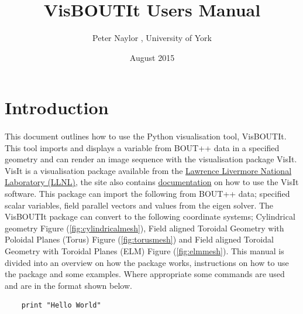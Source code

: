 \documentclass[12pt,a4paper]{article}
\author{Peter Naylor , University of York}
\title{VisBOUTIt Users Manual}
\date{August 2015}
\begin{document}
	\maketitle
	\tableofcontents
	\section{Introduction}
	\paragraph{}
	This document outlines how to use the Python visualisation tool, VisBOUTIt. This tool imports and displays a variable from BOUT++ data in a specified geometry and can render an image sequence with the visualisation package VisIt. VisIt is a visualisation package available from the \href{https://wci.llnl.gov/simulation/computer-codes/visit}{Lawrence Livermore National Laboratory (LLNL)}, the site also contains \href{https://wci.llnl.gov/simulation/computer-codes/visit/manuals}{documentation} on how to use the VisIt software.  This package can import the following from BOUT++ data; specified scalar variables, field parallel vectors and values from the eigen solver. The VisBOUTIt package can convert to the following coordinate systems; Cylindrical geometry Figure (\ref{fig:cylindricalmesh}), Field aligned Toroidal Geometry with Poloidal Planes (Torus) Figure (\ref{fig:torusmesh}) and Field aligned Toroidal Geometry with Toroidal Planes (ELM) Figure (\ref{fig:elmmesh}). 	This manual is divided into an overview on how the package works, instructions on how to use the package and some examples. Where appropriate some commands are used and are in the format shown below.
	
	\begin{verbatim}
	print "Hello World"
	\end{verbatim}
\end{document}
